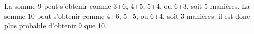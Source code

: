 La somme 9 peut s'obtenir comme 3+6, 4+5, 5+4, ou 6+3, soit 5 manières. La somme 10 peut s'obtenir comme 4+6, 5+5, ou 6+4, soit 3 manières: il est donc plus probable d'obtenir 9 que 10.
